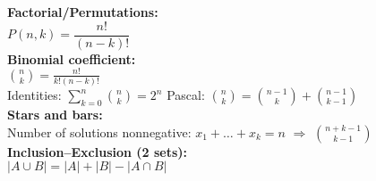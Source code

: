 \textbf{Factorial/Permutations:} \\[1mm]
$P(n,k)=\dfrac{n!}{(n-k)!}$ \\

\textbf{Binomial coefficient:} \\[1mm]
$\displaystyle \binom{n}{k}=\frac{n!}{k!(n-k)!}$ \\
Identities: $\sum_{k=0}^n \binom{n}{k}=2^n$ \quad Pascal: $\binom{n}{k}=\binom{n-1}{k}+\binom{n-1}{k-1}$ \\

\textbf{Stars and bars:} \\[1mm]
Number of solutions nonnegative: $x_1+\dots+x_k=n$ $\Rightarrow$ $\binom{n+k-1}{k-1}$ \\

\textbf{Inclusion--Exclusion (2 sets):} \\[1mm]
$|A\cup B| = |A| + |B| - |A\cap B|$ \\
